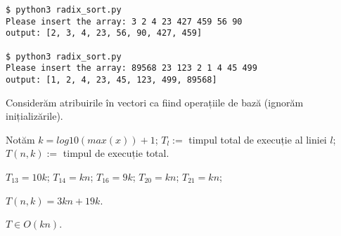 \documentclass[11pt]{article}
\begin{document}
\begin{verbatim}
$ python3 radix_sort.py
Please insert the array: 3 2 4 23 427 459 56 90
output: [2, 3, 4, 23, 56, 90, 427, 459]

$ python3 radix_sort.py
Please insert the array: 89568 23 123 2 1 4 45 499
output: [1, 2, 4, 23, 45, 123, 499, 89568]
\end{verbatim}


Considerăm atribuirile în vectori ca fiind operațiile de bază (ignorăm inițializările).

Notăm $k = \mathit{log10}(\mathit{max}(x)) + 1$; $T_l := $ timpul total de execuție al liniei $l$; $T(n, k) :=$ timpul de execuție total.

$T_{13} = 10 k$;
$T_{14} = k n$;
$T_{16} = 9 k$;
$T_{20} = k n$;
$T_{21} = k n$;

$T(n, k) = 3kn + 19k$.

\vspace{7pt}
$T \in O(kn)$.
\end{document}
